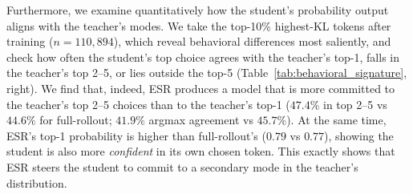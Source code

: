 \documentclass{article}
\newcommand{\method}{ESR}
\begin{document}
Furthermore, we examine quantitatively how the student's probability output aligns with the teacher's modes. We take the top-10\% highest-KL tokens after training ($n{=}110{,}894$), which reveal behavioral differences most saliently, and check how often the student's top choice agrees with the teacher's top-1, falls in the teacher's top 2--5, or lies outside the top-5 (Table~\ref{tab:behavioral_signature}, right). We find that, indeed, \method{} produces a model that is more committed to the teacher's top 2--5 choices than to the teacher's top-1 ($47.4\%$ in top 2--5 vs $44.6\%$ for full-rollout; $41.9\%$ argmax agreement vs $45.7\%$). At the same time, \method's top-1 probability is higher than full-rollout's ($0.79$ vs $0.77$), showing the student is also more \emph{confident} in its own chosen token. This exactly shows that \method{} steers the student to commit to a secondary mode in the teacher's distribution.
\end{document}
